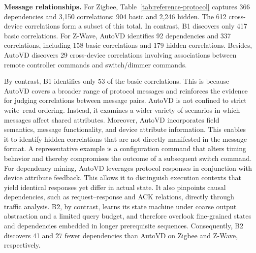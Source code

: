 \documentclass[10pt,journal,compsoc]{IEEEtran}
\newcommand{\parab}[1]{\vspace{0.04in}\noindent\textbf{#1}}
\begin{document}
\parab{Message relationships.} For Zigbee, Table~\ref{tab:reference-protocol} captures 366 dependencies and 3,150 correlations: 904 basic and 2,246 hidden. The 612 cross-device correlations form a subset of this total. In contrast, B1 discovers only 417 basic correlations. For Z-Wave, AutoVD identifies 92 dependencies and 337 correlations, including 158 basic correlations and 179 hidden correlations. Besides, AutoVD discovers 29 cross-device correlations involving associations between remote controller commands and switch/dimmer commands. 

By contrast, B1 identifies only 53 of the basic correlations. This is because AutoVD covers a broader range of protocol messages and reinforces the evidence for judging correlations between message pairs. AutoVD is not confined to strict write–read ordering. Instead, it examines a wider variety of scenarios in which messages affect shared attributes. Moreover, AutoVD incorporates field semantics, message functionality, and device attribute information. This enables it to identify hidden correlations that are not directly manifested in the message format. A representative example is a configuration command that alters timing behavior and thereby compromises the outcome of a subsequent switch command. For dependency mining, AutoVD leverages protocol responses in conjunction with device attribute feedback. This allows it to distinguish execution contexts that yield identical responses yet differ in actual state. It also pinpoints causal dependencies, such as request–response and ACK relations, directly through traffic analysis. B2, by contrast, learns its state machine under coarse output abstraction and a limited query budget, and therefore overlook fine-grained states and dependencies embedded in longer prerequisite sequences. Consequently, B2 discovers 41 and 27 fewer dependencies than AutoVD on Zigbee and Z-Wave, respectively.



\end{document}
